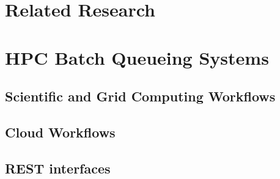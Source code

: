 
\section{Related Research}

\section{HPC Batch Queueing Systems}

\subsection{Scientific and Grid Computing Workflows}

\subsection{Cloud Workflows}

\subsection{REST interfaces}

